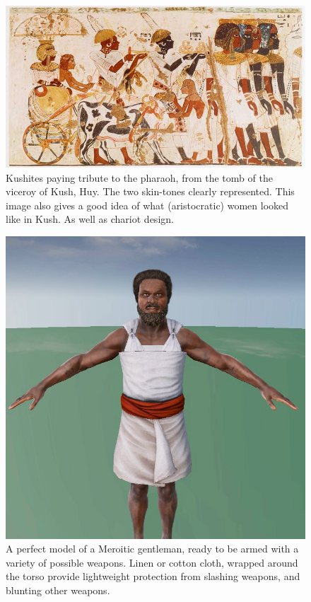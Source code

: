 \documentclass[a4paper,12pt]{scrreprt}
\begin{document}
\begin{figure}[H]
	\centering
	\includegraphics[width=\textwidth]{img/people/kushites_tribute_pharao}
	\caption{Kushites paying tribute to the pharaoh, from the tomb of the viceroy of Kush, Huy. The two skin-tones clearly represented. This image also gives a good idea of what (aristocratic) women looked like in Kush. As well as chariot design.}
\end{figure}


\begin{figure}[H]
	\centering
	\includegraphics[width=\textwidth]{img/people/kushite_gentlement}
	\caption{A perfect model of a Meroitic gentleman, ready to be armed with a variety of possible weapons. Linen or cotton cloth, wrapped around the torso provide lightweight protection from slashing weapons, and blunting other weapons. }
\end{figure}
\end{document}
